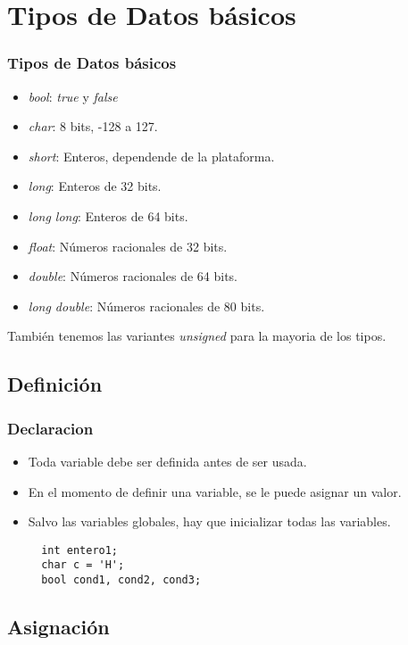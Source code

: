 \documentclass{beamer}
\begin{document}
\section{Tipos de Datos básicos}
\begin{frame}
\frametitle{Tipos de Datos básicos}
\begin{itemize}
 \item \emph{bool}: \emph{true} y \emph{false}
 \item \emph{char}: 8 bits, -128 a 127.
 \item \emph{short}: Enteros, dependende de la plataforma.
 \item \emph{long}: Enteros de 32 bits.
 \item \emph{long long}: Enteros de 64 bits.
 \item \emph{float}: Números racionales de 32 bits.
 \item \emph{double}: Números racionales de 64 bits.
 \item \emph{long double}: Números racionales de 80 bits.
\end{itemize}
También tenemos las variantes \emph{unsigned} para la mayoria de los tipos.
\end{frame}

\subsection{Definición}

\begin{frame}[fragile]
\frametitle{Declaracion}
\begin{itemize}
 \item Toda variable debe ser definida antes de ser usada.
 \item En el momento de definir una variable, se le puede asignar un valor.
 \item Salvo las variables globales, hay que inicializar todas las variables.

\begin{verbatim}
  int entero1;
  char c = 'H';
  bool cond1, cond2, cond3;
\end{verbatim}
\end{itemize}

\end{frame}

\subsection{Asignación}
\end{document}
